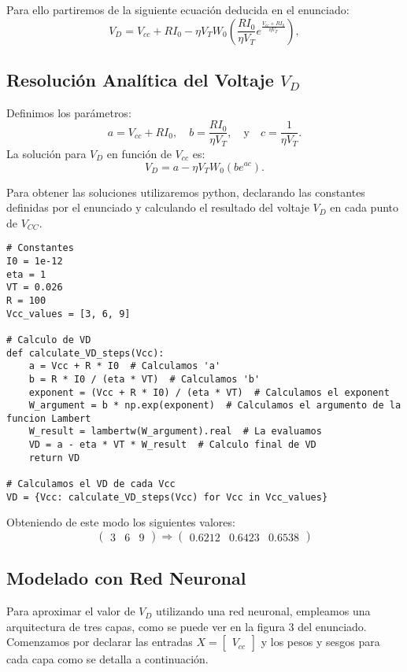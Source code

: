 \documentclass[paper=a4, fontsize=11pt]{scrartcl} %
\numberwithin{equation}{section} %
\numberwithin{figure}{section} %
\numberwithin{table}{section} %
\begin{document}
Para ello partiremos de la siguiente ecuación deducida en el enunciado:
\[
V_D = V_{cc} + RI_0 - \eta V_T W_0 \left( \frac{RI_0}{\eta V_T} e^{\frac{V_{cc} + RI_0}{\eta V_T}} \right),
\]

\subsection{Resolución Analítica del Voltaje $V_D$}

Definimos los parámetros:
\[
a = V_{cc} + RI_0, \quad b = \frac{R I_0}{\eta V_T}, \quad \text{y} \quad c = \frac{1}{\eta V_T}.
\]
La solución para $V_D$ en función de $V_{cc}$ es:
\[
V_D = a - \eta V_T W_0 \left( b e^{ac} \right).
\]

Para obtener las soluciones utilizaremos python, declarando las constantes definidas por el enunciado y calculando el resultado del voltaje $V_D$ en cada punto de $V_{CC}$.

\vspace{2mm}
\begin{lstlisting}
# Constantes
I0 = 1e-12
eta = 1
VT = 0.026 
R = 100
Vcc_values = [3, 6, 9]

# Calculo de VD
def calculate_VD_steps(Vcc):
    a = Vcc + R * I0  # Calculamos 'a'
    b = R * I0 / (eta * VT)  # Calculamos 'b'
    exponent = (Vcc + R * I0) / (eta * VT)  # Calculamos el exponent
    W_argument = b * np.exp(exponent)  # Calculamos el argumento de la funcion Lambert
    W_result = lambertw(W_argument).real  # La evaluamos
    VD = a - eta * VT * W_result  # Calculo final de VD
    return VD

# Calculamos el VD de cada Vcc
VD = {Vcc: calculate_VD_steps(Vcc) for Vcc in Vcc_values}
\end{lstlisting}
\vspace{2mm}

Obteniendo de este modo los siguientes valores:
\[
\begin{pmatrix} 3 & 6 & 9\end{pmatrix} \Rightarrow \begin{pmatrix} 0.6212 & 0.6423 & 0.6538 \end{pmatrix}
\]


\subsection{Modelado con Red Neuronal}

Para aproximar el valor de $V_D$ utilizando una red neuronal, empleamos una arquitectura de tres capas, como se puede ver en la figura 3 del enunciado. Comenzamos por declarar las entradas $X = \begin{bmatrix} V_{cc} \end{bmatrix}$ y los pesos y sesgos para cada capa como se detalla a continuación.
\end{document}
